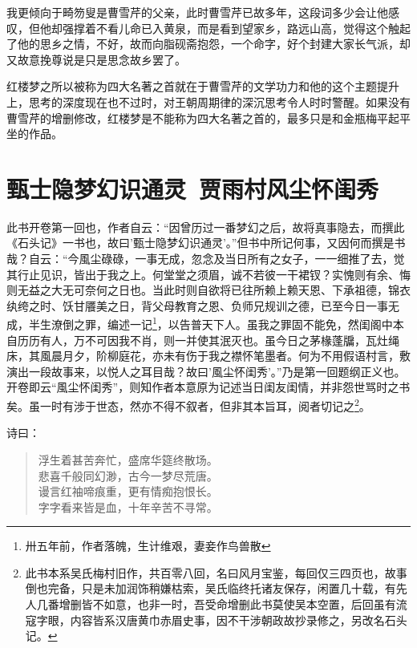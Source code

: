 \documentclass[12pt,oneside]{book}
\newenvironment{shici}{%
\begin{verse}%
\centering\large\hspace{12pt}}%
{\end{verse}}
\begin{document}
我更倾向于畸笏叟是曹雪芹的父亲，此时曹雪芹已故多年，这段词多少会让他感叹，但他却强撑着不看儿命已入黄泉，而是看到望家乡，路远山高，觉得这个触起了他的思乡之情，不好，故而向脂砚斋抱怨，一个命字，好个封建大家长气派，却又故意挽尊说是只是思念故乡罢了。


红楼梦之所以被称为四大名著之首就在于曹雪芹的文学功力和他的这个主题提升上，思考的深度现在也不过时，对王朝周期律的深沉思考令人时时警醒。如果没有曹雪芹的增删修改，红楼梦是不能称为四大名著之首的，最多只是和金瓶梅平起平坐的作品。




\setcounter{tocdepth}{2}    
\tableofcontents



\mainmatter


\chapter{甄士隐梦幻识通灵~贾雨村风尘怀闺秀}
此书开卷第一回也，作者自云：“因曾历过一番梦幻之后，故将真事隐去，而撰此《石头记》一书也，故曰’甄士隐梦幻识通灵’。”但书中所记何事，又因何而撰是书哉？自云：“今風尘碌碌，一事无成，忽念及当日所有之女子，一一细推了去，觉其行止见识，皆出于我之上。何堂堂之须眉，诚不若彼一干裙钗？实愧则有余、悔则无益之大无可奈何之日也。当此时则自欲将已往所赖上赖天恩、下承祖德，锦衣纨绔之时、饫甘餍美之日，背父母教育之恩、负师兄规训之德，已至今日一事无成，半生潦倒之罪，编述一记\footnote{卅五年前，作者落魄，生计维艰，妻妾作鸟兽散}，以告普天下人。虽我之罪固不能免，然闺阁中本自历历有人，万不可因我不肖，则一并使其泯灭也。虽今日之茅椽蓬牖，瓦灶绳床，其風晨月夕，阶柳庭花，亦未有伤于我之襟怀笔墨者。何为不用假语村言，敷演出一段故事来，以悦人之耳目哉？故曰’風尘怀闺秀’。”乃是第一回题纲正义也。开卷即云“風尘怀闺秀”，则知作者本意原为记述当日闺友闺情，并非怨世骂时之书矣。虽一时有涉于世态，然亦不得不叙者，但非其本旨耳，阅者切记之\footnote{此书本系吴氏梅村旧作，共百零八回，名曰风月宝鉴，每回仅三四页也，故事倒也完备，只是未加润饰稍嫌枯索，吴氏临终托诸友保存，闲置几十载，有先人几番增删皆不如意，也非一时，吾受命增删此书莫使吴本空置，后回虽有流寇字眼，内容皆系汉唐黄巾赤眉史事，因不干涉朝政故抄录修之，另改名石头记。}。

诗曰：

\begin{shici}
浮生着甚苦奔忙，盛席华筵终散场。\\
悲喜千般同幻渺，古今一梦尽荒唐。\\
谩言红袖啼痕重，更有情痴抱恨长。\\
字字看来皆是血，十年辛苦不寻常。
\end{shici}
\end{document}
